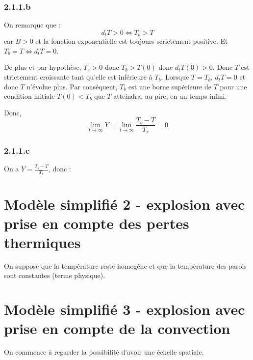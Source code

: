 \documentclass[10pt,a4paper,twocolumn]{article}
\begin{document}
\subsubsection{2.1.1.b}

On remarque que : $$ d_tT > 0 \Leftrightarrow T_b > T $$ car $B>0$ et la fonction exponentielle est toujours scrictement positive. Et $T_b = T \Leftrightarrow d_t T = 0$.

De plus et par hypothèse, $T_r > 0$ donc $T_b > T(0)$ donc $d_t T(0) > 0$. Donc $T$ est strictement croissante tant qu'elle est inférieure à $T_b$. Lorsque $T = T_b$, $d_t T = 0$ et donc $T$ n'évolue plus. Par conséquent, $T_b$ est une borne supérieure de $T$ pour une condition initiale $T(0) < T_b$ que $T$ atteindra, au pire, en un temps infini.

Donc, 
$$\lim_{t \rightarrow \infty} Y = \lim_{t \rightarrow \infty} \frac{T_b-T}{T_r} = 0 $$

\subsubsection{2.1.1.c}

On a $Y= \frac{T_b-T}{T_r}$, donc :



\section{Modèle simplifié 2 - explosion avec prise en compte des pertes thermiques}

On suppose que la température reste homogène et que la température des parois sont constantes (terme physique).

\section{Modèle simplifié 3 - explosion avec prise en compte de la convection}
On commence à regarder la possibilité d'avoir une échelle spatiale.
\end{document}
